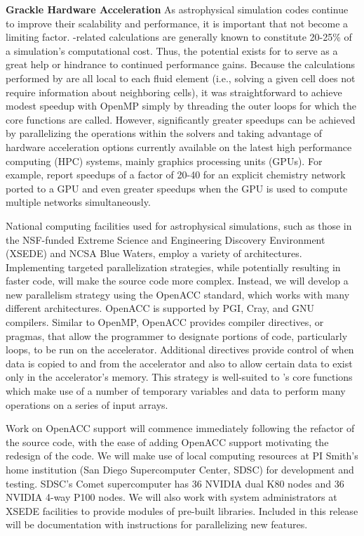 \noindent \textbf{Grackle Hardware Acceleration}
As astrophysical simulation codes continue to improve their
scalability and performance, it is important that \grackle{} not
become a limiting factor.  \grackle{}-related calculations are
generally known to constitute 20-25\% of a simulation's computational
cost.  Thus, the potential exists for \grackle{} to serve as a great
help or hindrance to continued performance gains.  Because the
calculations performed by \grackle{} are all local to each fluid
element (i.e., solving a given cell does not require information about
neighboring cells), it was straightforward to achieve modest speedup
with OpenMP simply by threading the outer loops for which the core
functions are called.  However, significantly greater speedups can be
achieved by parallelizing the operations within the solvers and taking
advantage of hardware acceleration options currently available on the
latest high performance computing (HPC) systems, mainly graphics
processing units (GPUs). For example, \citet{Haidar2016PerformanceAA}
report speedups of a factor of 20-40 for an explicit chemistry network
ported to a GPU and even greater speedups when the GPU is used to
compute multiple networks simultaneously.

National computing facilities used for astrophysical simulations, such
as those in the NSF-funded Extreme Science and Engineering Discovery
Environment (XSEDE) and NCSA Blue Waters, employ a variety of
architectures.  Implementing targeted parallelization strategies,
while potentially resulting in faster code, will make the source code
more complex. Instead, we will develop a new parallelism strategy
using the OpenACC standard, which works with many different
architectures.  OpenACC is supported 
by PGI, Cray, and GNU compilers.  Similar to OpenMP, OpenACC provides
compiler directives, or pragmas, that allow the programmer to
designate portions of code, particularly loops, to be run on the
accelerator.  Additional directives provide control of when data is
copied to and from the accelerator and also to allow certain data to
exist only in the accelerator's memory.  This strategy is well-suited
to \grackle{}'s core functions which make use of a number of temporary
variables and data to perform many operations on a series of input
arrays.

Work on OpenACC support will commence immediately following the
refactor of the \grackle{} source code, with the ease of adding
OpenACC support motivating the redesign of the code.  We will
make use of local computing resources at PI Smith's home institution
(San Diego Supercomputer Center, SDSC) for development and testing.
SDSC's Comet supercomputer has 36 NVIDIA dual K80 nodes and 36 NVIDIA
4-way P100 nodes. We will also work with system administrators at
XSEDE facilities to provide modules of pre-built \grackle{}
libraries.
Included in this release will be documentation with instructions for
parallelizing new features.

